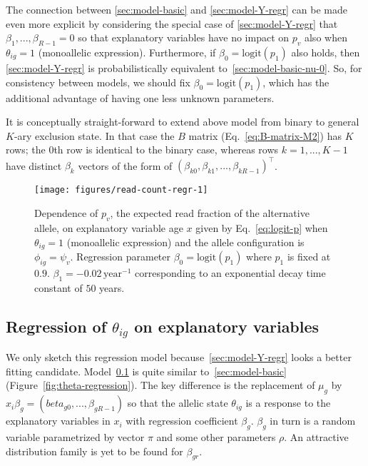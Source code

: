 \documentclass[letterpaper]{article}
\begin{document}
The connection between \ref{sec:model-basic} and \ref{sec:model-Y-regr} can be
made even more explicit by considering the special case of
\ref{sec:model-Y-regr} that \(\beta_1,...,\beta_{R-1}=0\) so that explanatory
variables have no impact on \(p_v\) also when \(\theta_{ig}=1\) (monoallelic
expression).  Furthermore, if \(\beta_0=\mathrm{logit}(p_1)\) also holds, then
\ref{sec:model-Y-regr} is probabilistically equivalent
to~\ref{sec:model-basic-nu-0}.  So, for consistency between models, we should
fix \(\beta_0=\mathrm{logit}(p_1)\), which has the additional advantage of
having one less unknown parameters.

It is conceptually straight-forward to extend above model from binary to
general \(K\)-ary exclusion state.  In that case the \(B\) matrix
(Eq.~\ref{eq:B-matrix-M2}) has \(K\) rows; the \(0\)th row is identical to the
binary case, whereas rows \(k=1,...,K-1\) have distinct \(\beta_k\) vectors
of the form of \((\beta_{k0},\beta_{k1},...,\beta_{kR-1})^\top\).

\begin{figure}[t]
\begin{center}
\texttt{[image: figures/read-count-regr-1]}
\caption{
Dependence of \(p_v\), the expected read fraction of the alternative allele,
on explanatory variable age \(x\) given by Eq.~\ref{eq:logit-p} when
\(\theta_{ig}=1\) (monoallelic expression) and the allele configuration is
\(\phi_{ig}=\psi_v\).  Regression parameter \(\beta_0 = \mathrm{logit}(p_1)\) where
\(p_1\) is fixed at \(0.9\).  \(\beta_1 = - 0.02 \, \mathrm{year}^{-1}\)
corresponding to an exponential decay time constant of \(50\) years.
}
\label{fig:Y-regression}
\end{center}
\end{figure}

\subsection{Regression of \(\theta_{ig}\) on explanatory variables }
\label{sec:model-theta-regr}

We only sketch this regression model because~\ref{sec:model-Y-regr} looks a
better fitting candidate. Model~\ref{sec:model-theta-regr} is quite similar
to~\ref{sec:model-basic} (Figure~\ref{fig:theta-regression}). The key
difference is the replacement of \(\mu_g\) by \(x_i
\beta_{g}=(beta_{g0},...,\beta_{gR-1})\) so that the allelic state
\(\theta_{ig}\) is a response to the explanatory variables in \(x_i\) with
regression coefficient \(\beta_g\).  \(\beta_g\) in turn is a random variable
parametrized by vector \(\pi\) and some other parameters \(\rho\).  An
attractive distribution family is yet to be found for \(\beta_{gr}\).
\end{document}
